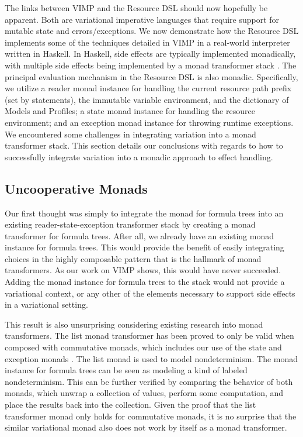 \documentclass[12pt,oneside]{book}
\begin{document}
The links between VIMP and the Resource DSL should now hopefully be apparent. Both are variational imperative
languages that require support for mutable state and errors/exceptions. We now demonstrate how the Resource
DSL implements some of the techniques detailed in VIMP in a real-world interpreter written in Haskell. In Haskell,
side effects are typically implemented monadically, with multiple side effects being implemented by a monad transformer
stack \cite{liang1995monad}. The principal evaluation mechanism in the Resource DSL is also monadic. Specifically,
we utilize a reader monad instance for handling the current resource path prefix (set by  statements),
the immutable variable environment, and the dictionary of Models and Profiles; a state monad instance for handling
the resource environment; and an exception monad instance for throwing runtime exceptions.
We encountered
some challenges in integrating variation into a monad transformer stack. This section details our conclusions with regards to
how to successfully integrate variation into a monadic approach to effect handling.

\subsection{Uncooperative Monads}

Our first thought was simply to integrate the monad for formula trees into an existing reader-state-exception transformer stack by
creating a monad transformer for formula trees.
After all, we already have an existing monad instance for formula trees. This would provide the benefit of easily integrating choices in the highly
composable pattern that is the hallmark of monad transformers. As our work on VIMP shows, this would have never succeeded.
Adding the monad instance for formula trees to the stack would not provide a variational context, or any other of the elements
necessary to support side effects in a variational setting.

This result is also unsurprising considering existing research into monad transformers. The list monad transformer has been
proved to only be valid when composed with commutative monads, which includes our use of the state and exception monads \cite{jones1993composing}.
The list monad is used to model nondeterminism. The monad instance for formula trees can be seen as modeling a kind of labeled nondeterminism.
This can be further verified by comparing the behavior of both monads, which unwrap a collection of values, perform some computation, and
place the results back into the collection. Given the proof that the list transformer monad only holds for commutative monads, it is no
surprise that the similar variational monad also does not work by itself as a monad transformer.
\end{document}
